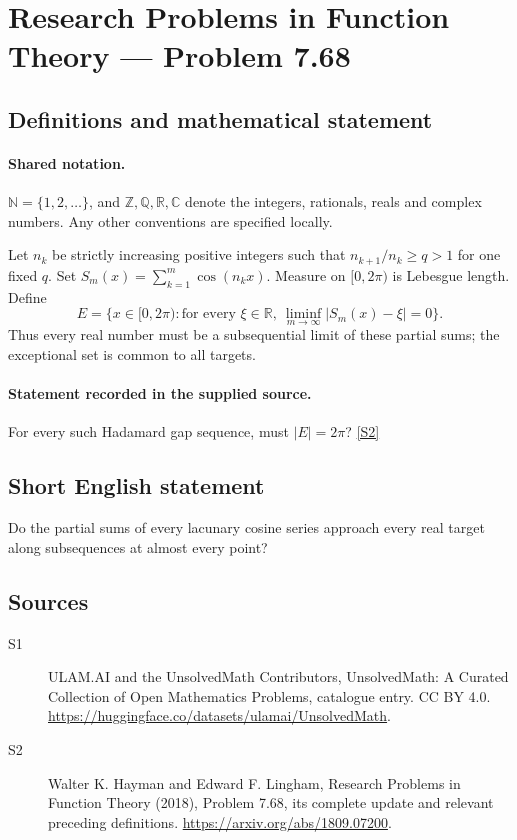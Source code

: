 \documentclass[11pt]{article}
\newcommand{\sref}[2]{\hyperlink{source:#1:#2}{[S#2]}}
\begin{document}
\section{Research Problems in Function Theory — Problem 7.68}\label{statement}

\subsection{Definitions and mathematical statement}

\paragraph{Shared notation.}$\mathbb N=\{1,2,\ldots\}$, and $\mathbb Z,\mathbb Q,\mathbb R,\mathbb C$ denote the integers, rationals, reals and complex numbers. Any other conventions are specified locally.


Let $n_k$ be strictly increasing positive integers such that $n_{k+1}/n_k\ge q>1$ for one fixed $q$. Set $S_m(x)=\sum_{k=1}^m\cos(n_kx)$. Measure on $[0,2\pi)$ is Lebesgue length. Define
\[E=\{x\in[0,2\pi):\text{for every }\xi\in\mathbb R,
\ \liminf_{m\to\infty}|S_m(x)-\xi|=0\}.
\]
Thus every real number must be a subsequential limit of these partial sums; the exceptional set is common to all targets.
\paragraph{Statement recorded in the supplied source.}
For every such Hadamard gap sequence, must $|E|=2\pi$? \sref{statement}{2}
\subsection{Short English statement}
Do the partial sums of every lacunary cosine series approach every real target along subsequences at almost every point?
\subsection{Sources}
\begin{description}
\item[\hypertarget{source:statement:1}{S1}] ULAM.AI and the UnsolvedMath Contributors, UnsolvedMath: A Curated Collection of Open Mathematics Problems, catalogue entry. CC BY 4.0. \url{https://huggingface.co/datasets/ulamai/UnsolvedMath}.
\item[\hypertarget{source:statement:2}{S2}] Walter K. Hayman and Edward F. Lingham, Research Problems in Function Theory (2018), Problem 7.68, its complete update and relevant preceding definitions. \url{https://arxiv.org/abs/1809.07200}.
\end{description}
\label{end:statement}
\end{document}

